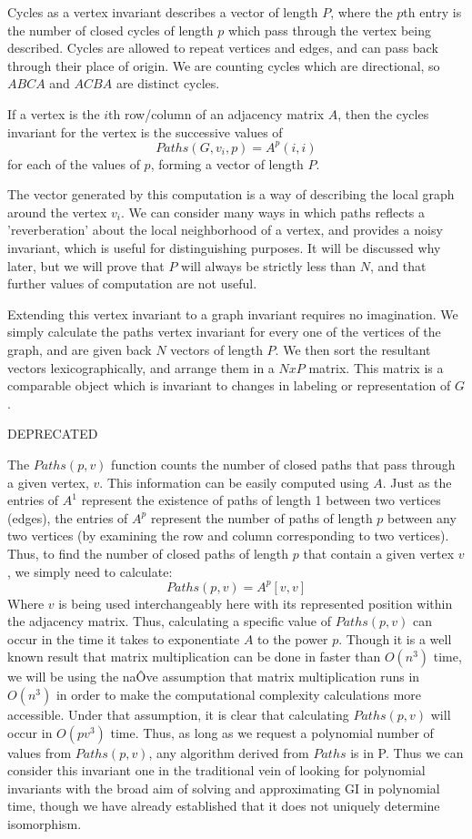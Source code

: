 \documentclass[11pt,a4paper]{report}
\begin{document}
Cycles as a vertex invariant describes a vector of length $P$, where the $p$th entry is the number of closed cycles of length $p$ which pass through the vertex being described.
Cycles are allowed to repeat vertices and edges, and can pass back through their place of origin.
We are counting cycles which are directional, so $ABCA$ and $ACBA$ are distinct cycles. 

If a vertex is the $i$th row/column of an adjacency matrix $A$, then the cycles invariant for the vertex is the successive values of $$Paths(G, v_i, p) = A^p(i,i)$$
for each of the values of $p$, forming a vector of length $P$.

The vector generated by this computation is a way of describing the local graph around the vertex $v_i$.
We can consider many ways in which paths reflects a 'reverberation' about the local neighborhood of a vertex, and provides a noisy invariant, which is useful for distinguishing purposes. 
It will be discussed why later, but we will prove that $P$ will always be strictly less than $N$, and that further values of computation are not useful.

Extending this vertex invariant to a graph invariant requires no imagination. 
We simply calculate the paths vertex invariant for every one of the vertices of the graph, and are given back $N$ vectors of length $P$.
We then sort the resultant vectors lexicographically, and arrange them in a $NxP$ matrix.
This matrix is a comparable object which is invariant to changes in labeling or representation of $G$.

DEPRECATED

The \(Paths(p, v)\) function counts the number of closed paths that pass through a given vertex, \(v\). 
This information can be easily computed using \(A\). Just as the entries of \(A^1\) represent the existence of paths of length 1 between two vertices (edges), the entries of \(A^p\) represent the number of paths of length \(p\) between any two vertices (by examining the row and column corresponding to two vertices). Thus, to find the number of closed paths of length \(p\) that contain a given vertex \(v\), we simply need to calculate: \[Paths(p, v) = A^p[v, v]\]Where \(v\) is being used interchangeably here with its represented position within the adjacency matrix. Thus, calculating a specific value of \(Paths(p, v)\) can occur in the time it takes to exponentiate \(A\) to the power \(p\).  Though it is a well known result that matrix multiplication can be done in faster than \(O(n^3)\) time, we will be using the naÔve assumption that matrix multiplication runs in \(O(n^3)\) in order to make the computational complexity calculations more accessible.  Under that assumption, it is clear that calculating \(Paths(p, v)\) will occur in \(O(pv^3)\) time.  Thus, as long as we request a polynomial number of values from \(Paths(p, v)\), any algorithm derived from \(Paths\) is in P. Thus we can consider this invariant one in the traditional vein of looking for polynomial invariants with the broad aim of solving and approximating GI in polynomial time, though we have already established that it does not uniquely determine isomorphism.
\end{document}
